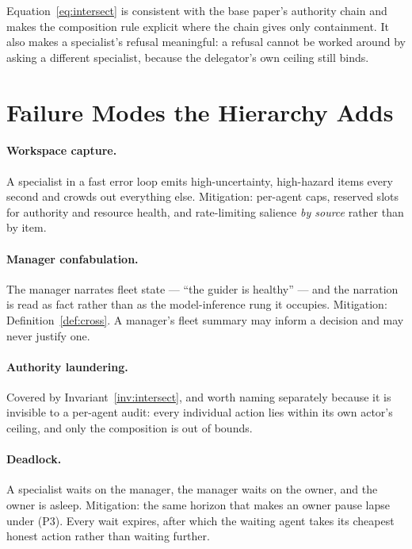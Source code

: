\documentclass[11pt]{article}
\begin{document}
Equation~\eqref{eq:intersect} is consistent with the base paper's authority chain and makes the composition rule explicit where the chain gives only containment. It also makes a specialist's refusal meaningful: a refusal cannot be worked around by asking a different specialist, because the delegator's own ceiling still binds.

\section{Failure Modes the Hierarchy Adds}
\label{sec:failure}

\paragraph{Workspace capture.} A specialist in a fast error loop emits high-uncertainty, high-hazard items every second and crowds out everything else. Mitigation: per-agent caps, reserved slots for authority and resource health, and rate-limiting salience \emph{by source} rather than by item.

\paragraph{Manager confabulation.} The manager narrates fleet state --- ``the guider is healthy'' --- and the narration is read as fact rather than as the model-inference rung it occupies. Mitigation: Definition~\ref{def:cross}. A manager's fleet summary may inform a decision and may never justify one.

\paragraph{Authority laundering.} Covered by Invariant~\ref{inv:intersect}, and worth naming separately because it is invisible to a per-agent audit: every individual action lies within its own actor's ceiling, and only the composition is out of bounds.

\paragraph{Deadlock.} A specialist waits on the manager, the manager waits on the owner, and the owner is asleep. Mitigation: the same horizon that makes an owner pause lapse under (P3). Every wait expires, after which the waiting agent takes its cheapest honest action rather than waiting further.
\end{document}
